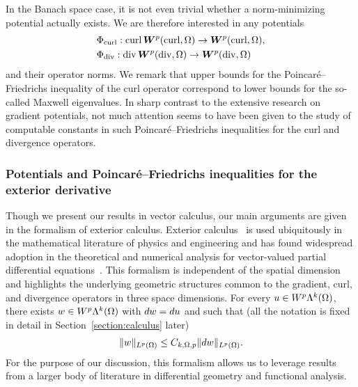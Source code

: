 \documentclass[10pt,a4paper]{article}
\begin{document}
In the Banach space case, it is not even trivial whether a norm-minimizing potential actually exists.
We are therefore interested in any potentials 
\begin{align}
    &\Phi_{\operatorname{curl}} : \operatorname{curl} \bm{W}^{p}(\operatorname{curl},\Omega) \rightarrow \bm{W}^{p}(\operatorname{curl},\Omega)
    ,
    \\
    &\Phi_{\operatorname{div}} : \operatorname{div} \bm{W}^{p}(\operatorname{div},\Omega) \rightarrow \bm{W}^{p}(\operatorname{div},\Omega)
\end{align}
and their operator norms. We remark that upper bounds for the Poincar\'e--Friedrichs inequality of the curl operator correspond to lower bounds for the so-called Maxwell eigenvalues. 
In sharp contrast to the extensive research on gradient potentials, 
not much attention seems to have been given to the study of computable constants in such Poincar\'e--Friedrichs inequalities for the curl and divergence operators. 




\subsubsection{Potentials and Poincar\'e--Friedrichs inequalities for the exterior derivative}

Though we present our results in vector calculus, our main arguments are given in the formalism of exterior calculus. 
Exterior calculus~\cite{greub1967multilinear,lee2012smooth} is used ubiquitously in the mathematical literature of physics and engineering and has found widespread adoption in the theoretical and numerical analysis for vector-valued partial differential equations~\cite{hiptmair2002finite, gross2004electromagnetic, arnold2006finite, arnold2009geometric, arnold2010finite, demlow2014posteriori, licht2021local, arnold2021complexes}. 
This formalism is independent of the spatial dimension and highlights the underlying geometric structures common to the gradient, curl, and divergence operators in three space dimensions.
For every $u \in W^{p}\Lambda^{k}(\Omega)$, there exists $w \in W^{p}\Lambda^{k}(\Omega)$ with $d w = d u$ and such that (all the notation is fixed in detail in Section~\ref{section:calculus} later)
\begin{align}\label{math:intro:exterior:pf} 
    \| w \|_{L^{p}(\Omega)} \leq  C_{k,\Omega,p} \| d w \|_{L^{p}(\Omega)}.
\end{align} 
For the purpose of our discussion, this formalism allows us to leverage results from a larger body of literature in differential geometry and functional analysis. 
\end{document}
